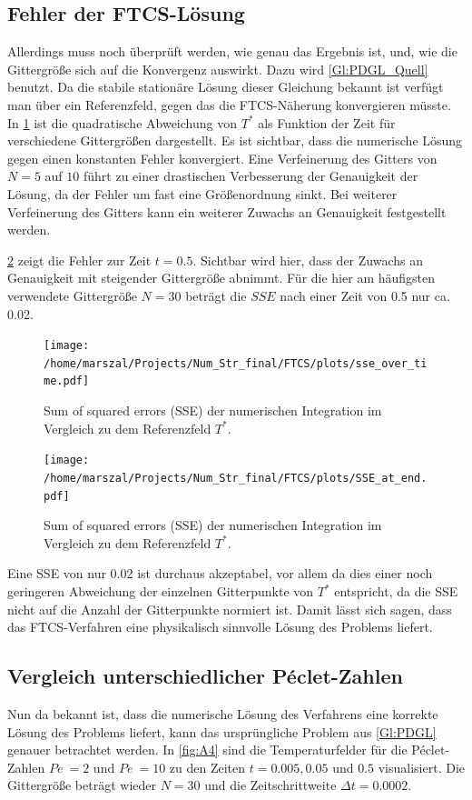 \subsection{Fehler der FTCS-Lösung}
Allerdings muss noch überprüft werden, wie genau das Ergebnis ist, und, wie die Gittergröße sich auf die Konvergenz auswirkt.
Dazu wird \cref{Gl:PDGL_Quell} benutzt. Da die stabile stationäre Lösung dieser Gleichung bekannt ist verfügt man über ein Referenzfeld, gegen das die FTCS-Näherung konvergieren müsste.
In \cref{fig:Performance1} ist die quadratische Abweichung von $T^*$ als Funktion der Zeit für verschiedene Gittergrößen dargestellt.
Es ist sichtbar, dass die numerische Lösung gegen einen konstanten Fehler konvergiert.
Eine Verfeinerung des Gitters von $N=5$ auf $10$ führt zu einer drastischen Verbesserung der Genauigkeit der Lösung, da der Fehler um fast eine Größenordnung sinkt. Bei weiterer Verfeinerung des Gitters kann ein weiterer Zuwachs an Genauigkeit festgestellt werden.

\cref{fig:Performance2} zeigt die Fehler zur Zeit $t=0.5$. Sichtbar wird hier, dass der Zuwachs an Genauigkeit mit steigender Gittergröße abnimmt.
Für die hier am häufigsten verwendete Gittergröße $N=30$ beträgt die $SSE$ nach einer Zeit von 0.5 nur ca. 0.02.
\begin{figure}
\centering
\texttt{[image: /home/marszal/Projects/Num\_Str\_final/FTCS/plots/sse\_over\_time.pdf]}\caption{Sum of squared errors (SSE) der numerischen Integration im Vergleich zu dem Referenzfeld $T^*$.}\label{fig:Performance1}
\end{figure}
\begin{figure}
\centering
\texttt{[image: /home/marszal/Projects/Num\_Str\_final/FTCS/plots/SSE\_at\_end.pdf]}\caption{Sum of squared errors (SSE) der numerischen Integration im Vergleich zu dem Referenzfeld $T^*$.}\label{fig:Performance2}
\end{figure}
Eine SSE von nur 0.02 ist durchaus akzeptabel, vor allem da dies einer noch geringeren Abweichung der einzelnen Gitterpunkte von $T^*$ entspricht, da die SSE nicht auf die Anzahl der Gitterpunkte normiert ist. Damit lässt sich sagen, dass das FTCS-Verfahren eine physikalisch sinnvolle Lösung des Problems liefert.

\subsection{Vergleich unterschiedlicher Péclet-Zahlen}
Nun da bekannt ist, dass die numerische Lösung des Verfahrens eine korrekte Lösung des Problems liefert, kann das ursprüngliche Problem aus \cref{Gl:PDGL} genauer betrachtet werden.
In \cref{fig:A4} sind die Temperaturfelder für die Péclet-Zahlen $Pe~=2$ und $Pe~=10$ zu den Zeiten $t = 0.005,0.05$ und $0.5$ visualisiert. Die Gittergröße beträgt wieder $N=30$ und die Zeitschrittweite $\Delta t=0.0002$.

